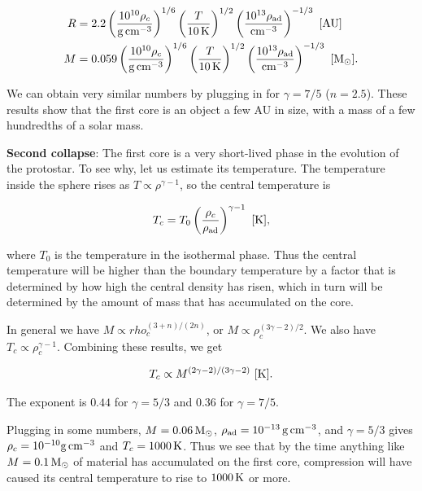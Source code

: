 \documentclass[a4paper,10pt]{article}
\begin{document}
\begin{align*}
    R &= 2.2 \left(\frac{10^{10}\rho_c}{{\rm g\,cm^{-3}}}\right)^{1/6} \left(\frac{T}{10\,{\rm K}}\right)^{1/2} \left(\frac{10^{13}\rho_{\rm ad}}{{\rm cm^{-3}}}\right)^{-1/3} ~ [{\rm AU}] \\
    M &= 0.059 \left(\frac{10^{10}\rho_c}{{\rm g\,cm^{-3}}}\right)^{1/6} \left(\frac{T}{10\,{\rm K}}\right)^{1/2} \left(\frac{10^{13}\rho_{\rm ad}}{{\rm cm^{-3}}}\right)^{-1/3} ~ [{\rm M_\odot}].
\end{align*}

{\noindent}We can obtain very similar numbers by plugging in for $\gamma=7/5$ ($n=2.5$). These results show that the first core is an object a few AU in size, with a mass of a few hundredths of a solar mass.

{\noindent}\textbf{Second collapse}: The first core is a very short-lived phase in the evolution of the protostar. To see why, let us estimate its temperature. The temperature inside the sphere rises as $T\propto\rho^{\gamma-1}$, so the central temperature is

\begin{align*}
    T_c = T_0 \left(\frac{\rho_c}{\rho_{\rm ad}}\right) ^{\gamma-1} ~ [{\rm K}],
\end{align*}

{\noindent}where $T_0$ is the temperature in the isothermal phase. Thus the central temperature will be higher than the boundary temperature by a factor that is determined by how high the central density has risen, which in turn will be determined by the amount of mass that has accumulated on the core.

{\noindent}In general we have $M\propto
rho_c^{(3+n)/(2n)}$, or $M\propto\rho_c^{(3\gamma-2)/2}$. We also have $T_c\propto\rho_c^{\gamma-1}$. Combining these results, we get

\begin{align*}
    T_c \propto M^{(2\gamma-2)/(3\gamma-2)} ~ [{\rm K}].
\end{align*}

{\noindent}The exponent is $0.44$ for $\gamma=5/3$ and $0.36$ for $\gamma=7/5$.

{\noindent}Plugging in some numbers, $M=0.06\,{\rm M_\odot}$, $\rho_{\rm ad}=10^{-13}\,{\rm g\,cm^{-3}}$, and $\gamma=5/3$ gives $\rho_c=10^{-10}{\rm g\,cm^{-3}}$ and $T_c=1000\,{\rm K}$. Thus we see that by the time anything like $M=0.1\,{\rm M_\odot}$ of material has accumulated on the first core, compression will have caused its central temperature to rise to $1000\,{\rm K}$ or more.
\end{document}

